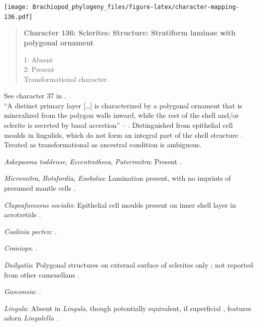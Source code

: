 \documentclass[openany]{book}
\begin{document}
\texttt{[image: Brachiopod\_phylogeny\_files/figure-latex/character-mapping-136.pdf]}

\begin{quote}
\textbf{Character 136: Sclerites: Structure: Stratiform laminae with
polygonal ornament}

1: Absent\\
2: Present\\
Transformational character.
\end{quote}

See character 37 in \citet{Williams1998Thediversity}.\\
``A distinct primary layer {[}\ldots{}{]} is characterized by a
polygonal ornament that is mineralized from the polygon walls inward,
while the rest of the shell and/or sclerite is secreted by basal
accretion'' -- \citet{Balthasar2009Homologousskeletal}. Distinguished
from epithelial cell moulds in lingulids, which do not form an integral
part of the shell structure \citep{Balthasar2009Homologousskeletal}.\\
Treated as transformational as ancestral condition is ambiguous.

\hypertarget{Askepasma_toddense-coding-136}{}
\emph{Askepasma toddense}, \emph{Eccentrotheca}, \emph{Paterimitra}:
Present \citep{Balthasar2009Homologousskeletal}.

\hypertarget{Botsfordia-coding-136}{}
\emph{Micromitra}, \emph{Botsfordia}, \emph{Eoobolus}: Lamination
present, with no imprints of presumed mantle cells
\citep[following][appendix 2]{Williams1998Thediversity}.

\hypertarget{Clupeafumosus_socialis-coding-136}{}
\emph{Clupeafumosus socialis}: Epithelial cell moulds present on inner
shell layer in acrotretids \citep{Zhang2016Epithelialcell}.

\hypertarget{Coolinia_pecten-coding-136}{}
\emph{Coolinia pecten}: \citet{Dewing2004}.

\hypertarget{Craniops-coding-136}{}
\emph{Craniops}: \citep[fig. 249.1]{Williams1997Introduction}.

\hypertarget{Dailyatia-coding-136}{}
\emph{Dailyatia}: Polygonal structures on external surface of sclerites
only \citep{Skovsted2015Theearly}; not reported from other camenellans
\citep{Balthasar2009Homologousskeletal}.

\hypertarget{Gasconsia-coding-136}{}
\emph{Gasconsia}: \citet{Hanken1985Thetaxonomy}.

\hypertarget{Lingula-coding-136}{}
\emph{Lingula}: Absent in \emph{Lingula}, though potentially equivalent,
if superficial \citep{Balthasar2009Homologousskeletal}, features adorn
\emph{Lingulella} \citep{Curry1983}.
\end{document}
